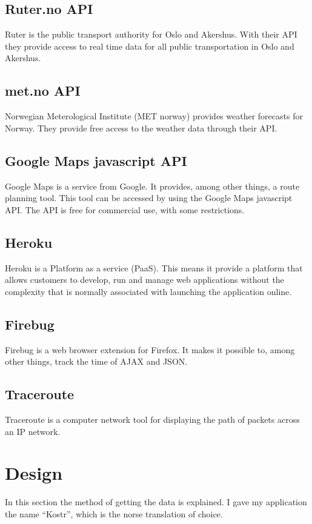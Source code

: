 \documentclass[10pt,a4paper]{article}
\begin{document}
\subsection{Ruter.no API}
\label{sec:ruter.no-api}
Ruter is the public transport authority for Oslo and Akershus\cite{ruterinfo}. With their API they provide access to real time data for all public transportation in Oslo and Akershus.

\subsection{met.no API}
\label{sec:met.no-api-1}
Norwegian Meterological Institute (MET norway) provides weather forecasts for Norway. They provide free access to the weather data through their API. \cite{metnoinfo}

\subsection{Google Maps javascript API}
\label{sec:google-maps-javascr-1}
Google Maps is a service from Google. It provides, among other things, a route planning tool. This tool can be accessed by using the Google Maps javascript API. The API is free for commercial use, with some restrictions. \cite{gmapsinfo}

\subsection{Heroku}
\label{sec:heroku}
Heroku is a Platform as a service (PaaS)\cite{herokuinfo}. This means it provide a platform that allows customers to develop, run and manage web applications without the complexity that is normally associated with launching the application online\cite{paas}.

\subsection{Firebug}
Firebug is a web browser extension for Firefox. It makes it possible to, among other things, track the time of AJAX and JSON. \cite{firebug}

\subsection{Traceroute}
Traceroute is a computer network tool for displaying the path of packets across an IP network. \cite{traceroute}
\section{Design}
In this section the method of getting the data is explained. I gave my application the name ``Kostr'', which is the norse translation of choice.
\end{document}
